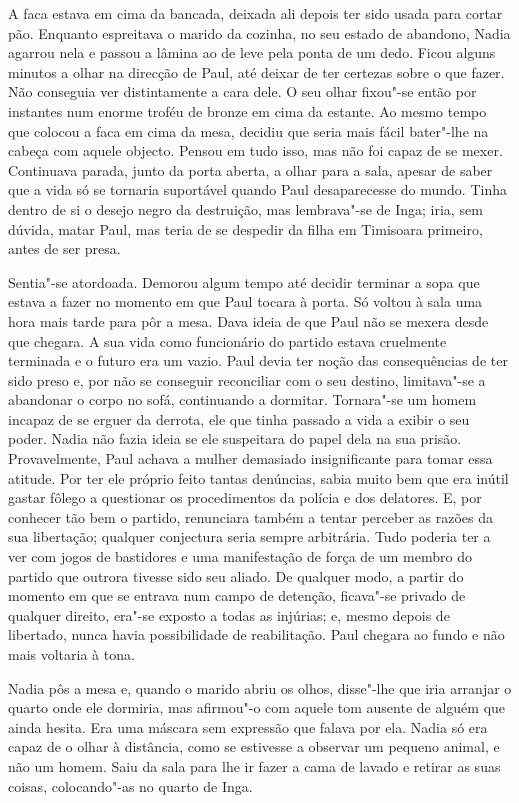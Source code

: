 A faca estava em cima da bancada, deixada ali depois ter sido usada para
cortar pão. Enquanto espreitava o marido da cozinha, no seu estado de
abandono, Nadia agarrou nela e passou a lâmina ao de leve pela ponta de
um dedo. Ficou alguns minutos a olhar na direcção de Paul, até deixar de
ter certezas sobre o que fazer. Não conseguia ver distintamente a cara
dele. O seu olhar fixou"-se então por instantes num enorme troféu de
bronze em cima da estante. Ao mesmo tempo que colocou a faca em cima da
mesa,
decidiu que seria mais fácil bater"-lhe na cabeça com aquele objecto.
Pensou em tudo isso, mas não foi capaz de se mexer. Continuava parada,
junto da porta aberta, a olhar para a sala, apesar de saber que a vida
só se tornaria suportável quando Paul desaparecesse do mundo. Tinha
dentro de si o desejo negro da destruição, mas lembrava"-se de Inga;
iria, sem dúvida, matar Paul, mas teria de se despedir da filha em
Timisoara primeiro, antes de ser presa.

Sentia"-se atordoada. Demorou algum tempo até decidir terminar a sopa que
estava a fazer no momento em que Paul tocara à porta. Só voltou à sala
uma hora mais tarde para pôr a mesa. Dava ideia de que Paul não se
mexera desde que chegara. A sua vida como funcionário do partido
estava cruelmente terminada e o futuro era um vazio. Paul devia ter
noção das consequências de ter sido preso e, por não se conseguir
reconciliar com o seu destino, limitava"-se a abandonar o corpo no sofá,
continuando a dormitar. Tornara"-se um homem incapaz de se erguer da
derrota, ele que tinha passado a vida a exibir o seu poder. Nadia não
fazia ideia se ele suspeitara do papel dela na sua prisão.
Provavelmente, Paul achava a mulher demasiado insignificante para
tomar essa atitude. Por ter ele próprio feito tantas denúncias, sabia
muito bem que era inútil gastar fôlego a questionar os procedimentos da
polícia e dos delatores. E, por conhecer tão bem o partido, renunciara
também a tentar perceber as razões da sua libertação; qualquer
conjectura seria sempre arbitrária. Tudo poderia ter a ver com jogos de
bastidores e uma manifestação de força de um membro do partido que
outrora tivesse sido seu aliado. De qualquer modo, a partir do momento em que se entrava num campo de detenção, ficava"-se
privado de qualquer direito, era"-se exposto a todas as injúrias; e,
mesmo depois de libertado, nunca havia possibilidade de reabilitação.
Paul chegara ao fundo e não mais voltaria à tona.

Nadia pôs a mesa e, quando o marido abriu os olhos, disse"-lhe que iria
arranjar o quarto onde ele dormiria, mas afirmou"-o com aquele tom
ausente de alguém que ainda hesita. Era uma máscara sem expressão que
falava por ela. Nadia só era capaz de o olhar à distância, como se estivesse a observar um pequeno animal, e não um homem. Saiu da sala para
lhe ir fazer a cama de lavado e retirar as suas coisas, colocando"-as no
quarto de Inga.

